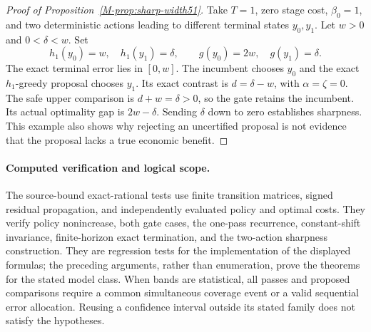 \begin{proof}[Proof of Proposition~\ref{M-prop:sharp-width51}]
Take $T=1$, zero stage cost, $\beta_0=1$, and two deterministic actions
leading to different terminal states $y_0,y_1$. Let $w>0$ and
$0<\delta<w$. Set
\[
 h_1(y_0)=w,\quad h_1(y_1)=\delta,\qquad
 g(y_0)=2w,\quad g(y_1)=\delta.
\]
The exact terminal error lies in $[0,w]$. The incumbent chooses $y_0$ and
the exact $h_1$-greedy proposal chooses $y_1$. Its exact contrast is
$d=\delta-w$, with $\alpha=\zeta=0$. The safe upper comparison is
$d+w=\delta>0$, so the gate retains the incumbent. Its actual optimality
gap is $2w-\delta$. Sending $\delta$ down to zero establishes sharpness.
This example also shows why rejecting an uncertified proposal is not evidence
that the proposal lacks a true economic benefit.
\end{proof}

\paragraph{Computed verification and logical scope.}
The source-bound exact-rational tests use finite transition matrices, signed
residual propagation, and independently evaluated policy and optimal costs.
They verify policy nonincrease, both gate cases, the one-pass recurrence,
constant-shift invariance, finite-horizon exact termination, and the two-action
sharpness construction. They are regression tests for the implementation of
the displayed formulas; the preceding arguments, rather than enumeration,
prove the theorems for the stated model class. When bands are statistical,
all passes and proposed comparisons require a common simultaneous coverage
event or a valid sequential error allocation. Reusing a confidence interval
outside its stated family does not satisfy the hypotheses.
